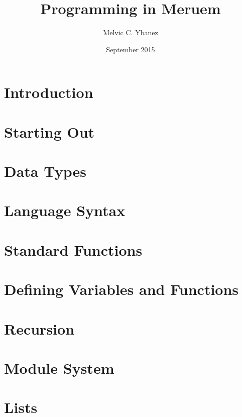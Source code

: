 \documentclass[12pt, twoside, obeyspaces]{report}
\title{Programming in Meruem}
\author{Melvic C. Ybanez}
\date{September 2015}
\begin{document}
	\maketitle
	
	\tableofcontents
	
	\chapter*{Introduction}
		
	
	\chapter{Starting Out}
	
	
	\chapter{Data Types}
	
	
	\chapter{Language Syntax}
	
	
	\chapter{Standard Functions}
	\label{ch:standard-functions}
	
	
	\chapter{Defining Variables and Functions}
	
	
	\chapter{Recursion}
	
	
	\chapter{Module System}
	
	
	\chapter{Lists}
	
\end{document}

